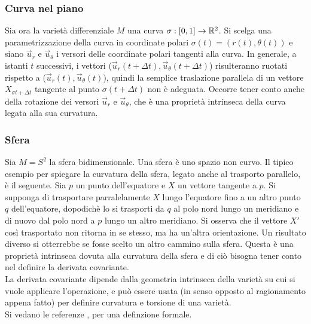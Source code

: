 \subsubsection{Curva nel piano}
Sia ora la varietà differenziale $M$ una curva $\sigma : [0,1] \to \mathbb{R}^2$. Si scelga
una parametrizzazione della curva in coordinate polari $\sigma(t) = (r(t),\theta(t))$ e
siano $\vec u _r$ e $\vec u _\theta$ i versori delle coordinate polari tangenti
alla curva. In generale, a istanti $t$ successivi, i vettori
($\vec u _r (t+\Delta t) ,\vec u _\theta (t + \Delta t)$) risulteranno ruotati
rispetto a ($\vec u _r (t), \vec u _\theta (t) $), quindi la semplice traslazione
parallela di un vettore $X_{\sigma{t+\Delta t}}$ tangente al punto $\sigma(t + \Delta t)$
non è adeguata. Occorre tener conto anche della rotazione dei versori
$\vec u _r$ e $\vec u _\theta$, che è una proprietà intrinseca della curva legata
alla sua curvatura.

\subsubsection{Sfera}
Sia $M=S^2$ la sfera bidimensionale. Una sfera è uno spazio non curvo. Il tipico
esempio per spiegare la curvatura della sfera, legato anche al trasporto parallelo,
è il seguente. Sia $p$ un punto dell'equatore e $X$ un vettore tangente a $p$. Si
supponga di trasportare parralelamente $X$ lungo l'equatore fino a un altro punto
$q$ dell'equatore, dopodichè lo si trasporti da $q$ al polo nord lungo un meridiano
e di nuovo dal polo nord a $p$ lungo un altro meridiano. Si osserva che il vettore
$X'$ così trasportato non ritorna in se stesso, ma ha un'altra orientazione. Un
risultato diverso si otterrebbe se fosse scelto un altro cammino sulla sfera.
Questa è una proprietà intrinseca dovuta alla curvatura della sfera e di ciò
bisogna tener conto nel definire la derivata covariante.\\

La derivata covariante dipende dalla geometria intrinseca della varietà su cui
si vuole applicare l'operazione, e può essere usata (in senso opposto al ragionamento
appena fatto) per definire curvatura e torsione di una varietà.\\
Si vedano le referenze \cite{boothby},\cite{nakahara} per una definzione formale.
